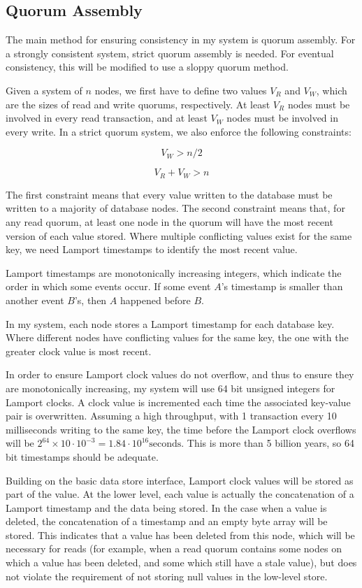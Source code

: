 \documentclass[12pt,a4paper]{article}
\begin{document}
\subsection*{Quorum Assembly}

The main method for ensuring consistency in my system is quorum assembly. For a strongly consistent system, strict quorum assembly is needed. For eventual consistency, this will be modified to use a sloppy quorum method.

Given a system of $n$ nodes, we first have to define two values $V_R$ and $V_W$, which are the sizes of read and write quorums, respectively. At least $V_R$ nodes must be involved in every read transaction, and at least $V_W$ nodes must be involved in every write. In a strict quorum system, we also enforce the following constraints:

$$V_W > n / 2$$

$$V_R + V_W > n$$

The first constraint means that every value written to the database must be written to a majority of database nodes. The second constraint means that, for any read quorum, at least one node in the quorum will have the most recent version of each value stored. Where multiple conflicting values exist for the same key, we need Lamport timestamps to identify the most recent value.

Lamport timestamps are monotonically increasing integers, which indicate the order in which some events occur. If some event $A$'s timestamp is smaller than another event $B$'s, then $A$ happened before $B$.

In my system, each node stores a Lamport timestamp for each database key. Where different nodes have conflicting values for the same key, the one with the greater clock value is most recent.

In order to ensure Lamport clock values do not overflow, and thus to ensure they are monotonically increasing, my system will use 64 bit unsigned integers for Lamport clocks. A clock value is incremented each time the associated key-value pair is overwritten. Assuming a high throughput, with 1 transaction every 10 milliseconds writing to the same key, the time before the Lamport clock overflows will be $2^{64} \times 10 \cdot 10^{-3} = 1.84 \cdot 10^{16} \text{seconds}$. This is more than 5 billion years, so 64 bit timestamps should be adequate.

Building on the basic data store interface, Lamport clock values will be stored as part of the value. At the lower level, each value is actually the concatenation of a Lamport timestamp and the data being stored. In the case when a value is deleted, the concatenation of a timestamp and an empty byte array will be stored. This indicates that a value has been deleted from this node, which will be necessary for reads (for example, when a read quorum contains some nodes on which a value has been deleted, and some which still have a stale value), but does not violate the requirement of not storing null values in the low-level store.
\end{document}
